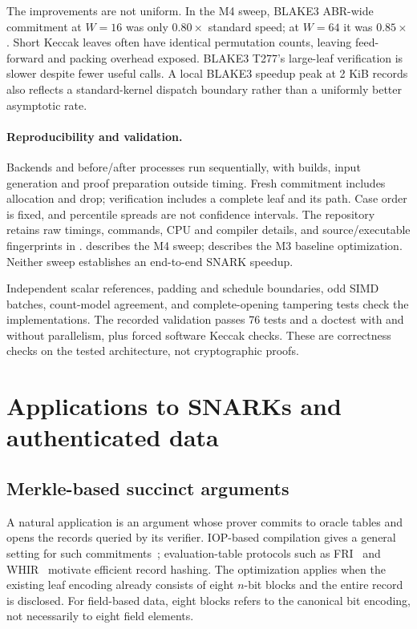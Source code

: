 \documentclass[11pt,letterpaper]{article}
\theoremstyle{definition} %
\begin{document}
The improvements are not uniform. In the M4 sweep, BLAKE3 ABR-wide
commitment at $W=16$ was only $0.80\times$ standard speed; at $W=64$
it was $0.85\times$. Short Keccak leaves often have identical permutation
counts, leaving feed-forward and packing overhead exposed. BLAKE3 T277's
large-leaf verification is slower despite fewer useful calls. A local
BLAKE3 speedup peak at 2 KiB records also reflects a standard-kernel
dispatch boundary rather than a uniformly better asymptotic rate.

\paragraph{Reproducibility and validation.}
Backends and before/after processes run sequentially, with builds, input
generation and proof preparation outside timing. Fresh commitment includes
allocation and drop; verification includes a complete leaf and its path.
Case order is fixed, and percentile spreads are not confidence intervals.
The repository retains raw timings, commands, CPU and compiler details,
and source/executable fingerprints in .
 describes the M4 sweep;
 describes the M3 baseline optimization.
Neither sweep establishes an end-to-end SNARK speedup.

Independent scalar references, padding and schedule boundaries, odd SIMD
batches, count-model agreement, and complete-opening tampering tests check
the implementations. The recorded validation passes 76 tests and a doctest
with and without parallelism, plus forced software Keccak checks. These
are correctness checks on the tested architecture, not cryptographic proofs.

\section{Applications to SNARKs and authenticated data}
\label{sec:applications}
\subsection{Merkle-based succinct arguments}
A natural application is an argument whose prover commits to oracle tables
and opens the records queried by its verifier. IOP-based compilation gives
a general setting for such commitments~\cite{BCS16}; evaluation-table
protocols such as FRI~\cite{BBHR18} and WHIR~\cite{ACFY24} motivate efficient
record hashing. The optimization applies when the existing leaf encoding
already consists of eight $n$-bit blocks and the entire record is disclosed.
For field-based data, eight blocks refers to the canonical bit encoding,
not necessarily to eight field elements.
\end{document}
